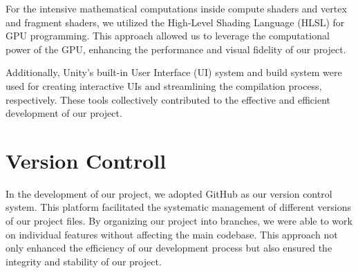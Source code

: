 For the intensive mathematical computations inside compute shaders and vertex and fragment shaders, we utilized the High-Level Shading Language (HLSL) for GPU programming. This approach allowed us to leverage the computational power of the GPU, enhancing the performance and visual fidelity of our project.

Additionally, Unity’s built-in User Interface (UI) system and build system were used for creating interactive UIs and streamlining the compilation process, respectively. These tools collectively contributed to the effective and efficient development of our project.

\section{Version Controll}
In the development of our project, we adopted GitHub as our version control system. This platform facilitated the systematic management of different versions of our project files. By organizing our project into branches, we were able to work on individual features without affecting the main codebase. This approach not only enhanced the efficiency of our development process but also ensured the integrity and stability of our project.

